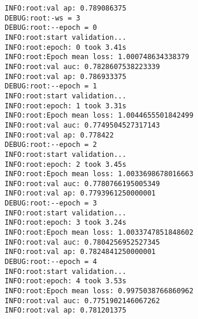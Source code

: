 \documentclass[11pt]{article}
\begin{document}
\begin{verbatim}
INFO:root:val ap: 0.789086375
DEBUG:root:-ws = 3
DEBUG:root:--epoch = 0
INFO:root:start validation...
INFO:root:epoch: 0 took 3.41s
INFO:root:Epoch mean loss: 1.000748634338379
INFO:root:val auc: 0.7828607538223339
INFO:root:val ap: 0.786933375
DEBUG:root:--epoch = 1
INFO:root:start validation...
INFO:root:epoch: 1 took 3.31s
INFO:root:Epoch mean loss: 1.0044655501842499
INFO:root:val auc: 0.7749504527317143
INFO:root:val ap: 0.778422
DEBUG:root:--epoch = 2
INFO:root:start validation...
INFO:root:epoch: 2 took 3.45s
INFO:root:Epoch mean loss: 1.0033698678016663
INFO:root:val auc: 0.7780766195005349
INFO:root:val ap: 0.7793961250000001
DEBUG:root:--epoch = 3
INFO:root:start validation...
INFO:root:epoch: 3 took 3.24s
INFO:root:Epoch mean loss: 1.0033747851848602
INFO:root:val auc: 0.7804256952527345
INFO:root:val ap: 0.7824841250000001
DEBUG:root:--epoch = 4
INFO:root:start validation...
INFO:root:epoch: 4 took 3.53s
INFO:root:Epoch mean loss: 0.9975038766860962
INFO:root:val auc: 0.7751902146067262
INFO:root:val ap: 0.781201375
\end{verbatim}
\end{document}
